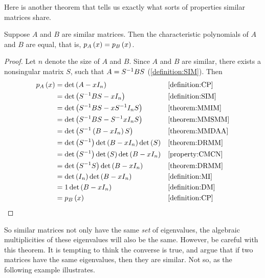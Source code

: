 \documentclass{ximera}
\begin{document}
Here is another theorem that tells us exactly what sorts of properties similar matrices share.

\begin{theorem}
\label{theorem:SMEE}

Suppose $A$ and $B$ are similar matrices.  Then the characteristic polynomials of $A$ and $B$ are equal, that is, $p_{A}\left(x\right)=p_{B}\left(x\right)$.

\begin{proof}
  Let $n$ denote the size of $A$ and $B$.  Since $A$ and $B$ are
  similar, there exists a nonsingular matrix $S$, such that
  $A=S^{-1}BS$ (\ref{definition:SIM}).  Then
  \begin{align*}
    p_{A}\left(x\right)&=\det\left(A-xI_n\right)&&\ref{definition:CP}\\
                   &=\det\left(S^{-1}BS-xI_n\right)&&\ref{definition:SIM}\\
                   &=\det\left(S^{-1}BS-xS^{-1}I_nS\right)&&\ref{theorem:MMIM}\\
                   &=\det\left(S^{-1}BS-S^{-1}xI_nS\right)&&\ref{theorem:MMSMM}\\
                   &=\det\left(S^{-1}\left(B-xI_n\right)S\right)&&\ref{theorem:MMDAA}\\
                   &=\det\left(S^{-1}\right)\det\left(B-xI_n\right)\det\left(S\right)&&\ref{theorem:DRMM}\\
                   &=\det\left(S^{-1}\right)\det\left(S\right)\det\left(B-xI_n\right)&&\ref{property:CMCN}\\
                   &=\det\left(S^{-1}S\right)\det\left(B-xI_n\right)&&\ref{theorem:DRMM}\\
                   &=\det\left(I_n\right)\det\left(B-xI_n\right)&&\ref{definition:MI}\\
                   &=1\det\left(B-xI_n\right)&&\ref{definition:DM}\\
                   &=p_{B}\left(x\right)&&\ref{definition:CP}
  \end{align*}
\end{proof}
\end{theorem}

So similar matrices not only have the same \textit{set} of
eigenvalues, the algebraic multiplicities of these eigenvalues will
also be the same.  However, be careful with this theorem.  It is
tempting to think the converse is true, and argue that if two matrices
have the same eigenvalues, then they are similar.  Not so, as the
following example illustrates.
\end{document}
